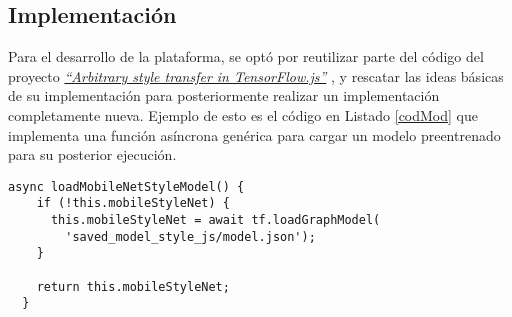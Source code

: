 



\clearpage
\subsection{Implementación}










Para el desarrollo de la plataforma, se optó por reutilizar parte del código del proyecto
\href{https://github.com/reiinakano/arbitrary-image-stylization-tfjs}{\emph{``Arbitrary style transfer in TensorFlow.js''}} \cite{nakanoReiinakanoArbitraryimagestylizationtfjs2020}, y rescatar las ideas básicas de su implementación para posteriormente realizar un implementación completamente nueva. Ejemplo de esto es el código en Listado \ref{codMod} que implementa una función asíncrona genérica  para cargar un modelo preentrenado para su posterior ejecución.

\lstset{style=customjs}
\begin{center}
\begin{minipage}{0.78\linewidth}
\begin{lstlisting}[caption=Código en JavaScript para cargar modelos, label=codMod]
  async loadMobileNetStyleModel() {
    if (!this.mobileStyleNet) {
      this.mobileStyleNet = await tf.loadGraphModel(
        'saved_model_style_js/model.json');
    }

    return this.mobileStyleNet;
  }
\end{lstlisting}
\end{minipage}
\end{center}




